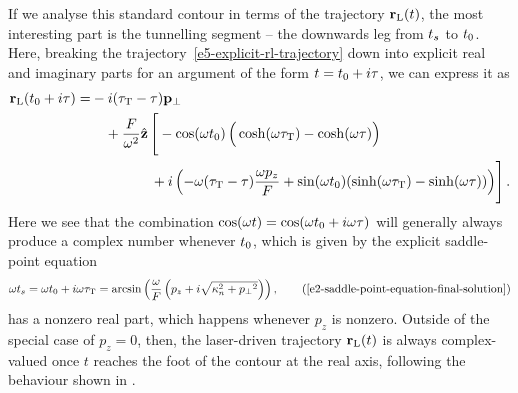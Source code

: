 If we analyse this standard contour in terms of the trajectory $\vb{r}_\mathrm{L}(t)$, the most interesting part is the tunnelling segment -- the downwards leg from ${t_s}$ to ${t_0}$. Here, breaking the trajectory~\eqref{e5-explicit-rl-trajectory} down into explicit real and imaginary parts for an argument of the form $t={t_0}+i\tau$, we can express it as
\begin{align}
\vb{r}_\mathrm{L}({t_0}+i\tau)
= &
- i({\tau_\mathrm{T}}-\tau){\vb{p}_{\perp}}
\nonumber \\ & \quad
+\frac{F}{\omega^2}\hat{\vb{z}} \left[\vphantom{\sum^n}
-\cos(\omega{t_0})
\left( \vphantom{\sum}
\cosh(\omega{\tau_\mathrm{T}})
-\cosh(\omega\tau)
\right)
\right. \nonumber \\ & \left. \vphantom{\sum^n} \qquad \qquad 
+i\left( 
-\omega({\tau_\mathrm{T}}-\tau)\frac{\omega p_z}{F}
+
\sin(\omega{t_0})(
\sinh(\omega{\tau_\mathrm{T}})
-\sinh(\omega\tau)
)
\right)
\right]
.
\label{e5-explicit-rl-trajectory-re-im-parts}
\end{align}
%
Here we see that the combination $\cos(\omega t) = \cos(\omega {t_0} + i \omega\tau)$ will generally always produce a complex number whenever ${t_0}$, which is given by the explicit saddle-point equation
\begin{equation}
\omega \ts
=\omega\tn+i\omega\tauT
= \arcsin\left(
\frac{\omega}{F}\left(p_z + i \sqrt{\kappa_n^2+\pt^2}\right)
\right)
,
\backtag{e2-saddle-point-equation-final-solution}
\end{equation}
has a nonzero real part, which happens whenever $p_z$ is nonzero. Outside of the special case of $p_z=0$, then, the laser-driven trajectory $\vb{r}_\mathrm{L}(t)$ is always complex-valued once $t$ reaches the foot of the contour at the real axis, following the behaviour shown in .


